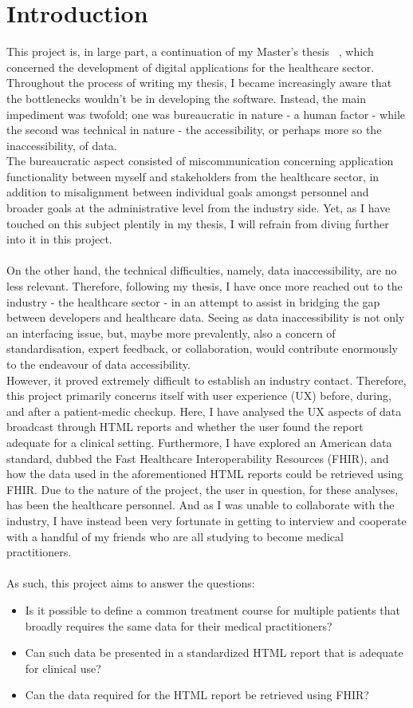 \section{Introduction}
This project is, in large part, a continuation of my Master's thesis ~\cite{thesis}, which concerned the development of digital applications for the healthcare sector. Throughout the process of writing my thesis, I became increasingly aware that the bottlenecks wouldn't be in developing the software. Instead, the main impediment was twofold; one was bureaucratic in nature - a human factor - while the second was technical in nature - the accessibility, or perhaps more so the inaccessibility, of data.
\\
The bureaucratic aspect consisted of miscommunication concerning application functionality between myself and stakeholders from the healthcare sector, in addition to misalignment between individual goals amongst personnel and broader goals at the administrative level from the industry side. Yet, as I have touched on this subject plentily in my thesis, I will refrain from diving further into it in this project. 
\\
\\
On the other hand, the technical difficulties, namely, data inaccessibility, are no less relevant. Therefore, following my thesis, I have once more reached out to the industry - the healthcare sector - in an attempt to assist in bridging the gap between developers and healthcare data. Seeing as data inaccessibility is not only an interfacing issue, but, maybe more prevalently, also a concern of standardisation, expert feedback, or collaboration, would contribute enormously to the endeavour of data accessibility.
\\
However, it proved extremely difficult to establish an industry contact. Therefore, this project primarily concerns itself with user experience (UX) before, during, and after a patient-medic checkup. Here, I have analysed the UX aspects of data broadcast through HTML reports and whether the user found the report adequate for a clinical setting. Furthermore, I have explored an American data standard, dubbed the Fast Healthcare Interoperability Resources (FHIR), and how the data used in the aforementioned HTML reports could be retrieved using FHIR.
Due to the nature of the project, the user in question, for these analyses, has been the healthcare personnel. And as I was unable to collaborate with the industry, I have instead been very fortunate in getting to interview and cooperate with a handful of my friends who are all studying to become medical practitioners. 
\\
\\
As such, this project aims to answer the questions:
\begin{itemize}
    \item Is it possible to define a common treatment course for multiple patients that broadly requires the same data for their medical practitioners?
    \item Can such data be presented in a standardized HTML report that is adequate for clinical use?
    \item Can the data required for the HTML report be retrieved using FHIR?
\end{itemize}   
